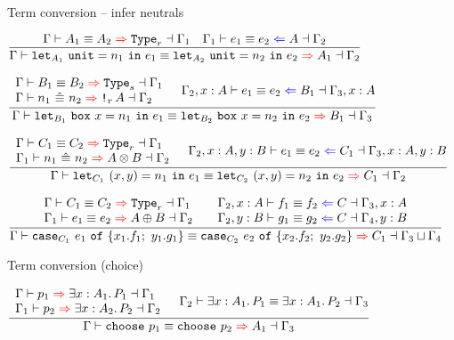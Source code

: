 \begin{frame}{Term conversion -- infer neutrals}

\begin{center}
  $\infrule{\infertypeconv{\Gamma}{A_1}{A_2}[r]{\Gamma_1} \quad \checktermconv{\Gamma_1}{e_1}{e_2}{A}{\Gamma_2}}{\infertermconv{\Gamma}{\unitelim{n_1}{e_1}[A_1]}{\unitelim{n_2}{e_2}[A_2]}{A_1}{\Gamma_2}}$

  \vspace{2em}

  $\infrule{\begin{array}{l} \infertypeconv{\Gamma}{B_1}{B_2}[s]{\Gamma_1} \\ \infertermconvwhnf{\Gamma}{n_1}{n_2}{\Box[r]{A}}{\Gamma_2} \end{array} \quad \checktermconv{\extend{\Gamma_2}{x}{A}}{e_1}{e_2}{B_1}{\extend{\Gamma_3}{x}{A}}}{\infertermconv{\Gamma}{\boxelim{x}{n_1}{e_1}[B_1]}{\boxelim{x}{n_2}{e_2}[B_2]}{B_1}{\Gamma_3}}$

  \vspace{2em}

  $\infrule{\begin{array}{l} \infertypeconv{\Gamma}{C_1}{C_2}[r]{\Gamma_1} \\ \infertermconvwhnf{\Gamma_1}{n_1}{n_2}{\Prod{A}{B}}{\Gamma_2} \end{array} \quad \checktermconv{\extend{\extend{\Gamma_2}{x}{A}}{y}{B}}{e_1}{e_2}{C_1}{\extend{\extend{\Gamma_3}{x}{A}}{y}{B}}}{\infertermconv{\Gamma}{\letpair{x}{y}{n_1}{e_1}[C_1]}{\letpair{x}{y}{n_2}{e_2}[C_2]}{C_1}{\Gamma_2}}$

  \vspace{1em}

  $\infrule{\begin{array}{l} \infertypeconv{\Gamma}{C_1}{C_2}[r]{\Gamma_1} \\ \infertermconv{\Gamma_1}{e_1}{e_2}{\Sum{A}{B}}{\Gamma_2} \end{array} \quad \begin{array}{l} \checktermconv{\extend{\Gamma_2}{x}{A}}{f_1}{f_2}{C}{\extend{\Gamma_3}{x}{A}} \\ \checktermconv{\extend{\Gamma_2}{y}{B}}{g_1}{g_2}{C}{\extend{\Gamma_4}{y}{B}} \end{array}}{\infertermconv{\Gamma}{\newcase{e_1}{x_1}{f_1}{y_1}{g_1}[C_1]}{\newcase{e_2}{x_2}{f_2}{y_2}{g_2}[C_2]}{C_1}{\lubctx{\Gamma_3}{\Gamma_4}}}$
\end{center}

\end{frame}

\begin{frame}{Term conversion (choice)}

\begin{center}
  $\infrule{\begin{array}{l} \inferproof{\Gamma}{p_1}{\Ex{x}[A_1]{P_1}}{\Gamma_1} \\ \inferproof{\Gamma_1}{p_2}{\Ex{x}[A_2]{P_2}}{\Gamma_2} \end{array} \quad \checkpropconv{\Gamma_2}{\Ex{x}[A_1]{P_1}}{\Ex{x}[A_1]{P_2}}{\Gamma_3}}{\infertermconv{\Gamma}{\choose{p_1}}{\choose{p_2}}{A_1}{\Gamma_3}}$
\end{center}

\end{frame}
